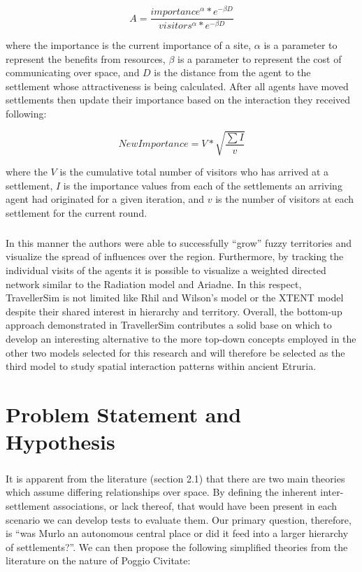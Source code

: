 \documentclass[12pt,a4paper]{thesis}
\begin{document}
		\begin{equation}
	 	A = \frac{importance^{\alpha} * e^{-\beta D}}{visitors^{\alpha} * e^{-\beta D}}
		\label{eq:attractiveness}
		\end{equation}
	
where the importance is the current importance of a site, $\alpha$ is a parameter to represent the benefits from resources, $\beta$ is a parameter to represent the cost of communicating over space, and $D$ is the distance from the agent to the settlement whose attractiveness is being calculated. After all agents have moved settlements then update their importance based on the interaction they received following:

		\begin{equation}
	 	New Importance = V * \sqrt{\frac{\sum{I}}{v}} 
		\label{eq:importance}
		\end{equation}
 
where the $V$ is the cumulative total number of visitors who has arrived at a settlement, $I$ is the importance values from each of the settlements an arriving agent had originated for a given iteration, and $v$ is the number of visitors at each settlement for the current round. 

\paragraph{}
In this manner the authors were able to successfully ``grow'' fuzzy territories and visualize the spread of influences over the region. Furthermore, by tracking the individual visits of the agents it is possible to visualize a weighted directed network similar to the Radiation model and Ariadne. In this respect, TravellerSim is not limited like Rhil and Wilson's model or the XTENT model despite their shared interest in hierarchy and territory. Overall, the bottom-up approach demonstrated in TravellerSim contributes a solid base on which to develop an interesting alternative to the more top-down concepts employed in the other two models selected for this research and will therefore be selected as the third model to study spatial interaction patterns within ancient Etruria. 

\chapter{Problem Statement and Hypothesis}

\paragraph{}
It is apparent from the literature (section 2.1) that there are two main theories which assume differing relationships over space. By defining the inherent inter-settlement associations, or lack thereof, that would have been present in each scenario we can develop tests to evaluate them. Our primary question, therefore, is ``was Murlo an autonomous central place or did it feed into a larger hierarchy of settlements?''. We can then propose the following simplified theories from the literature on the nature of Poggio Civitate:
	
\end{document}
